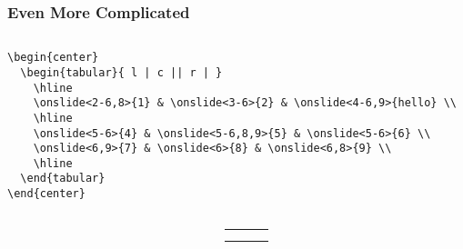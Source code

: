 \begin{frame}[fragile]
\frametitle{Even More Complicated}

  \begin{columns}
    \begin{column}{\textwidth}
      \begin{scriptsize}
\begin{verbatim}
\begin{center}
  \begin{tabular}{ l | c || r | }
    \hline
    \onslide<2-6,8>{1} & \onslide<3-6>{2} & \onslide<4-6,9>{hello} \\
    \hline
    \onslide<5-6>{4} & \onslide<5-6,8,9>{5} & \onslide<5-6>{6} \\
    \onslide<6,9>{7} & \onslide<6>{8} & \onslide<6,8>{9} \\
    \hline
  \end{tabular}
\end{center}
\end{verbatim}
      \end{scriptsize}
    \end{column}
  \end{columns}

  \begin{columns}
    \begin{column}{.6\textwidth}

    \end{column}

    \begin{column}{.4\textwidth}
      \begin{center}
        \begin{tabular}{ l | c || r | }
          \hline
          \onslide<2-6,8>{1} & \onslide<3-6>{2} & \onslide<4-6,9>{hello} \\
          \hline
          \onslide<5-6>{4} & \onslide<5-6,8,9>{5} & \onslide<5-6>{6} \\
          \onslide<6,9>{7} & \onslide<6>{8} & \onslide<6,8>{9} \\
          \hline
        \end{tabular}
      \end{center}
    \end{column}
  \end{columns}

\end{frame}

